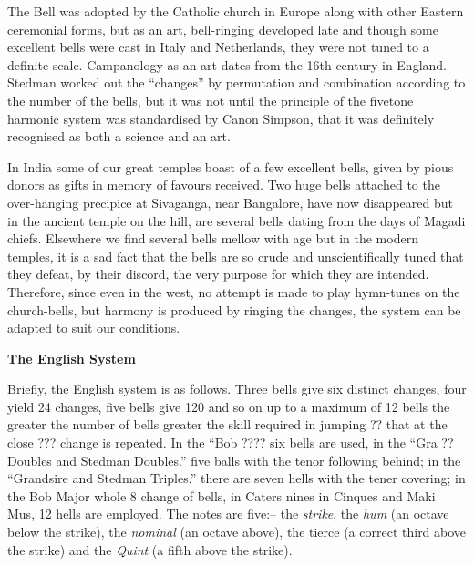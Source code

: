 \documentclass{book}
\begin{document}
The Bell was adopted by the Catholic church in Europe along with other
Eastern ceremonial forms, but as an art, bell-ringing developed late
and though some excellent bells were cast in Italy and Netherlands,
they were not tuned to a definite scale. Campanology as an art dates
from the 16th century in England. Stedman worked out the ``changes''
by permutation and combination according to the number of the bells,
but it was not until the principle of the fivetone harmonic system was
standardised by Canon Simpson, that it was definitely recognised as
both a science and an art. 

In India some of our great temples boast of a few excellent bells,
given by pious donors as gifts in memory of favours received. Two huge
bells attached to the over-hanging precipice at Sivaganga, near
Bangalore, have now disappeared but in the ancient temple on the hill,
are several bells dating from the days of Magadi chiefs. Elsewhere we
find several bells mellow with age but in the modern temples, it is a
sad fact that the bells are so crude and unscientifically tuned that
they defeat, by their discord, the very purpose for which they are
intended. Therefore, since even in the west, no attempt is made to
play hymn-tunes on the  church-bells, but harmony is produced by
ringing the changes, the system can be adapted to suit our conditions.

\begin{center}
\textbf{The English System}
\end{center}

Briefly, the English system is as follows. Three bells give six
distinct changes, four yield 24 changes, five bells give 120 and so on
up to a maximum of 12 bells the greater the number of bells greater
the skill required in jumping ?? that at the close ???  change is
repeated. In the ``Bob ???? six bells are used, in the ``Gra ??
Doubles and Stedman Doubles.'' five balls with the tenor following
behind; in the ``Grandsire and Stedman Triples.'' there are seven
hells with the tener covering; in the Bob Major whole 8 change of
bells, in Caters nines in Cinques and Maki Mus, 12 hells are
employed. The notes are five:-- the \textit{strike},  the \textit{hum}
(an octave below the strike), the \textit{nominal} (an octave above),
the tierce (a correct third above the strike) and the \textit{Quint}
(a fifth above the strike).
\end{document}
